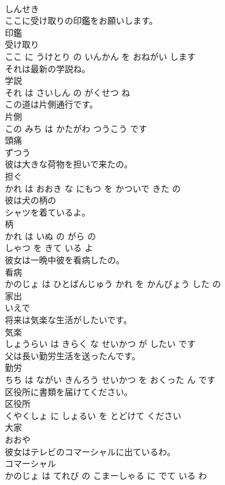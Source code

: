 \documentclass[8pt]{extreport}
\begin{document}
\begin{CJK}{UTF8}{min}
\\	しんせき		
\\	ここに受け取りの印鑑をお願いします。	
\\	印鑑 
\\	受け取り 
\\	ここ に うけとり の いんかん を おねがい します			
\\	それは最新の学説ね。	
\\	学説 
\\	それ は さいしん の がくせつ ね			
\\	この道は片側通行です。	
\\	片側 
\\	この みち は かたがわ つうこう です			
\\	頭痛	
\\	ずつう		
\\	彼は大きな荷物を担いで来たの。	
\\	担ぐ 
\\	かれ は おおき な にもつ を かついで きた の			
\\	彼は犬の柄の
\\	シャツを着ているよ。	
\\	柄 
\\	かれ は いぬ の がら の 
\\	しゃつ を きて いる よ			
\\	彼女は一晩中彼を看病したの。	
\\	看病 
\\	かのじょ は ひとばんじゅう かれ を かんびょう した の			
\\	家出	
\\	いえで		
\\	将来は気楽な生活がしたいです。	
\\	気楽 
\\	しょうらい は きらく な せいかつ が したい です			
\\	父は長い勤労生活を送ったんです。	
\\	勤労 
\\	ちち は ながい きんろう せいかつ を おくった ん です			
\\	区役所に書類を届けてください。	
\\	区役所 
\\	くやくしょ に しょるい を とどけて ください			
\\	大家	
\\	おおや		
\\	彼女はテレビのコマーシャルに出ているわ。	
\\	コマーシャル 
\\	かのじょ は てれび の こまーしゃる に でて いる わ			

\end{CJK}
\end{document}

